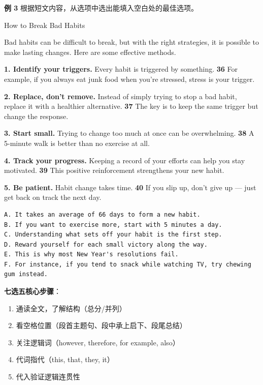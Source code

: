 \textbf{例 3} 根据短文内容，从选项中选出能填入空白处的最佳选项。

How to Break Bad Habits

Bad habits can be difficult to break, but with the right strategies, it is possible to make lasting changes. Here are some effective methods.

\textbf{1. Identify your triggers.}
Every habit is triggered by something. \textbf{36} \underline{\hspace{3cm}} For example, if you always eat junk food when you're stressed, stress is your trigger.

\textbf{2. Replace, don't remove.}
Instead of simply trying to stop a bad habit, replace it with a healthier alternative. \textbf{37} \underline{\hspace{3cm}} The key is to keep the same trigger but change the response.

\textbf{3. Start small.}
Trying to change too much at once can be overwhelming. \textbf{38} \underline{\hspace{3cm}} A 5-minute walk is better than no exercise at all.

\textbf{4. Track your progress.}
Keeping a record of your efforts can help you stay motivated. \textbf{39} \underline{\hspace{3cm}} This positive reinforcement strengthens your new habit.

\textbf{5. Be patient.}
Habit change takes time. \textbf{40} \underline{\hspace{3cm}} If you slip up, don't give up — just get back on track the next day.

\begin{verbatim}
A. It takes an average of 66 days to form a new habit.
B. If you want to exercise more, start with 5 minutes a day.
C. Understanding what sets off your habit is the first step.
D. Reward yourself for each small victory along the way.
E. This is why most New Year's resolutions fail.
F. For instance, if you tend to snack while watching TV, try chewing gum instead.
\end{verbatim}

\textbf{七选五核心步骤}：
\begin{enumerate}
  \item 通读全文，了解结构（总分/并列）
  \item 看空格位置（段首主题句、段中承上启下、段尾总结）
  \item 关注逻辑词（however, therefore, for example, also）
  \item 代词指代（this, that, they, it）
  \item 代入验证逻辑连贯性
\end{enumerate}

